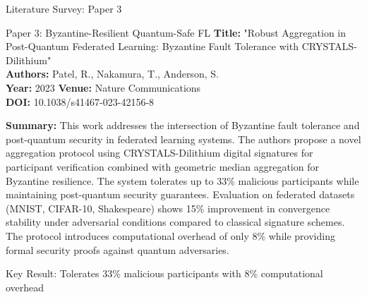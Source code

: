 \documentclass[aspectratio=169,11pt]{beamer}
\begin{document}
\begin{frame}{Literature Survey: Paper 3}

\begin{block}{Paper 3: Byzantine-Resilient Quantum-Safe FL}
\textbf{Title:} "Robust Aggregation in Post-Quantum Federated Learning: Byzantine Fault Tolerance with CRYSTALS-Dilithium"\\
\textbf{Authors:} Patel, R., Nakamura, T., Anderson, S.\\
\textbf{Year:} 2023 \textbf{Venue:} Nature Communications\\
\textbf{DOI:} 10.1038/s41467-023-42156-8
\end{block}

\textbf{Summary:} This work addresses the intersection of Byzantine fault tolerance and post-quantum security in federated learning systems. The authors propose a novel aggregation protocol using CRYSTALS-Dilithium digital signatures for participant verification combined with geometric median aggregation for Byzantine resilience. The system tolerates up to 33\% malicious participants while maintaining post-quantum security guarantees. Evaluation on federated datasets (MNIST, CIFAR-10, Shakespeare) shows 15\% improvement in convergence stability under adversarial conditions compared to classical signature schemes. The protocol introduces computational overhead of only 8\% while providing formal security proofs against quantum adversaries.

\begin{center}
\footnotesize{Key Result: Tolerates 33\% malicious participants with 8\% computational overhead}
\end{center}

\end{frame}
\end{document}
